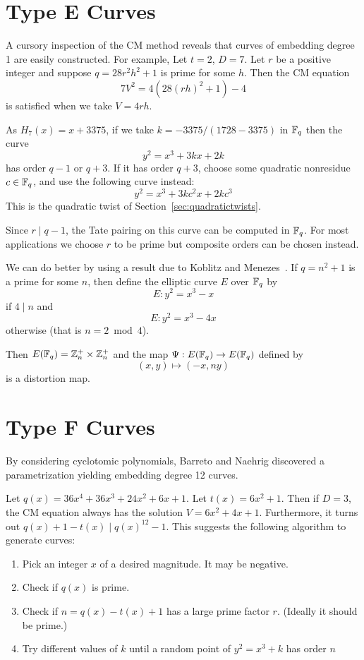 \section {Type E Curves}

A cursory inspection of the CM method reveals that
curves of embedding degree 1 are easily constructed. For example,
Let $t = 2$, $D = 7$. Let $r$ be a positive integer
and suppose $q = 28 r^2 h^2 + 1$ is prime for some $h$.
Then the CM equation
\[
7 V^2 = 4 (28 (r h)^2 + 1) - 4
\]
is satisfied when we take $V = 4 r h$.

As $H_7(x) = x + 3375$, if we take $k = -3375 / (1728 - 3375)$ in $\mathbb{F}_q$
then the curve
\[
y^2 = x^3 + 3k x + 2k
\]
has order $q - 1$ or $q + 3$. If it has order $q+3$, choose some
quadratic nonresidue $c \in \mathbb{F}_q$, and use the following curve instead:
\[ y^2 = x^3 + 3 k c^2 x + 2 k c^3 \]
This is the quadratic twist of Section~\ref{sec:quadratictwists}.

Since $r \mid q-1$, the Tate pairing on this curve can be computed
in $\mathbb{F}_q$. For most applications we choose $r$ to be prime but composite
orders can be chosen instead.

We can do better by using a result due to Koblitz and Menezes~\cite{km}.
If $q = n^2 + 1$ is a prime for some $n$, then define the elliptic curve
$E$ over $\mathbb{F}_q$ by
\[E:y^2 = x^3  - x\]
if $4 \mid n$ and
\[E:y^2 = x^3 - 4x\]
otherwise (that is $n = 2 \bmod 4$).

Then $E(\mathbb{F}_q) = \mathbb{Z}_n^+ \times \mathbb{Z}_n^+$ and the map
$\Psi:E(\mathbb{F}_q) \rightarrow E(\mathbb{F}_q)$
defined by
\[(x,y) \mapsto (-x, ny)\]
is a distortion map.

\section {Type F Curves}

By considering cyclotomic polynomials,
Barreto and Naehrig discovered a parametrization yielding embedding
degree 12 curves.

Let $q(x) = 36x^4 + 36x^3 + 24x^2 + 6x + 1$. Let $t(x) = 6x^2 + 1$.
Then if $D = 3$, the CM equation always has the solution
$V = 6x^2 + 4x + 1$. Furthermore,
it turns out $q(x) + 1 - t(x) \mid q(x)^{12} - 1$.
This suggests the following algorithm to generate curves:

\begin{enumerate}
\item
Pick an integer $x$ of a desired magnitude. It may be negative.
\item
Check if $q(x)$ is prime.
\item
Check if $n = q(x) - t(x) + 1$ has a large prime factor $r$.
(Ideally it should be prime.)
\item
Try different values of $k$ until a random point of
$y^2 = x^3 + k$ has order $n$
\end{enumerate}

